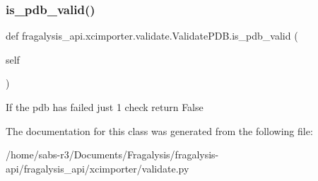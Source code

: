 \subsubsection{\texorpdfstring{is\+\_\+pdb\+\_\+valid()}{is\_pdb\_valid()}}
{\footnotesize\ttfamily def fragalysis\+\_\+api.\+xcimporter.\+validate.\+Validate\+P\+D\+B.\+is\+\_\+pdb\+\_\+valid (\begin{DoxyParamCaption}\item[{}]{self }\end{DoxyParamCaption})}

\begin{DoxyVerb}If the pdb has failed just 1 check return False
\end{DoxyVerb}
 

The documentation for this class was generated from the following file\+:\begin{DoxyCompactItemize}
\item 
/home/sabs-\/r3/\+Documents/\+Fragalysis/fragalysis-\/api/fragalysis\+\_\+api/xcimporter/validate.\+py\end{DoxyCompactItemize}
